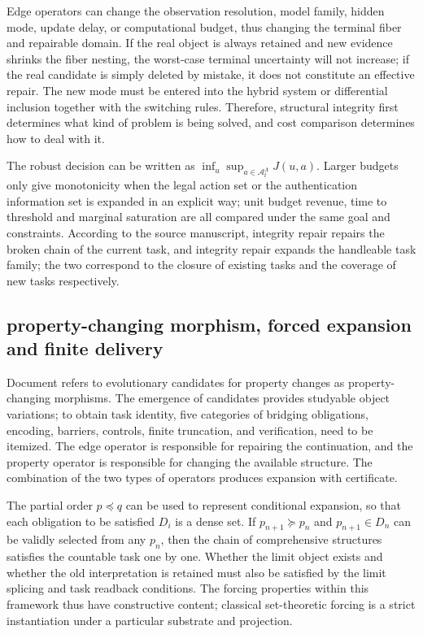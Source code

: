 \documentclass[11pt,a4paper]{article}
\theoremstyle{plain}
\theoremstyle{definition}
\theoremstyle{remark}
\begin{document}
\begin{CJK*}
Edge operators can change the observation resolution, model family, hidden mode, update delay, or computational budget, thus changing the terminal fiber and repairable domain. If the real object is always retained and new evidence shrinks the fiber nesting, the worst-case terminal uncertainty will not increase; if the real candidate is simply deleted by mistake, it does not constitute an effective repair. The new mode must be entered into the hybrid system or differential inclusion together with the switching rules. Therefore, structural integrity first determines what kind of problem is being solved, and cost comparison determines how to deal with it.

The robust decision can be written as $\inf_u\sup_{a\in\mathcal A_t^{\Lambda}}J(u,a)$. Larger budgets only give monotonicity when the legal action set or the authentication information set is expanded in an explicit way; unit budget revenue, time to threshold and marginal saturation are all compared under the same goal and constraints. According to the source manuscript, integrity repair repairs the broken chain of the current task, and integrity repair expands the handleable task family; the two correspond to the closure of existing tasks and the coverage of new tasks respectively.

\subsection { property-changing morphism, forced expansion and finite delivery }

Document \cite{S29} refers to evolutionary candidates for property changes as property-changing morphisms. The emergence of candidates provides studyable object variations; to obtain task identity, five categories of bridging obligations, encoding, barriers, controls, finite truncation, and verification, need to be itemized. The edge operator is responsible for repairing the continuation, and the property operator is responsible for changing the available structure. The combination of the two types of operators produces expansion with certificate.

The partial order $p\preceq q$ can be used to represent conditional expansion, so that each obligation to be satisfied $D_i$ is a dense set. If $p_{n+1}\succeq p_n$ and $p_{n+1}\in D_n$ can be validly selected from any $p_n$, then the chain of comprehensive structures satisfies the countable task one by one. Whether the limit object exists and whether the old interpretation is retained must also be satisfied by the limit splicing and task readback conditions. The forcing properties within this framework thus have constructive content; classical set-theoretic forcing is a strict instantiation under a particular substrate and projection.


\end{CJK*}
\end{document}
